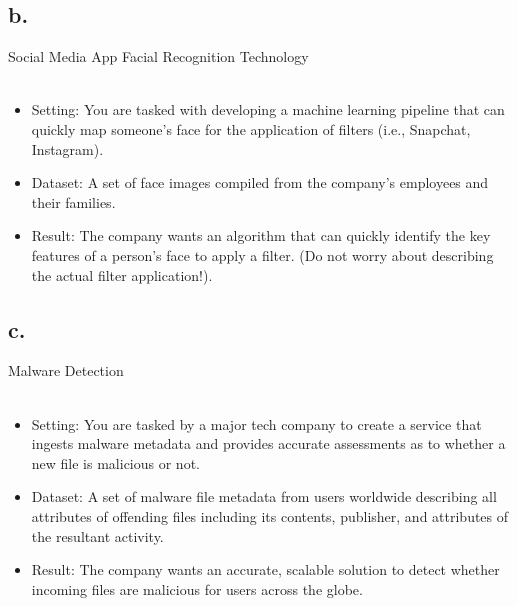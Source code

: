 \documentclass{article}
\newcommand{\1}{\mathbf{1}}
\begin{document}
{\subsection*{b.}

Social Media App Facial Recognition Technology \\ \\
\begin{itemize}
    \item Setting: You are tasked with developing a machine learning pipeline that can quickly map someone’s face for the application of filters (i.e., Snapchat, Instagram).
    \item Dataset: A set of face images compiled from the company’s employees and their families.
    \item  Result: The company wants an algorithm that can quickly identify the key features of a person’s face to apply a filter. (Do not worry about describing the actual filter application!).
\end{itemize}



\subsection*{c.}

Malware Detection \\ \\
\begin{itemize}
    \item Setting: You are tasked by a major tech company to create a service that ingests malware metadata and provides accurate assessments as to whether a new file is malicious or not.
    \item Dataset: A set of malware file metadata from users worldwide describing all attributes of offending files including its contents, publisher, and attributes of the resultant activity.
    \item Result: The company wants an accurate, scalable solution to detect whether incoming files are malicious for users across the globe.
\end{itemize}



}
\end{document}
